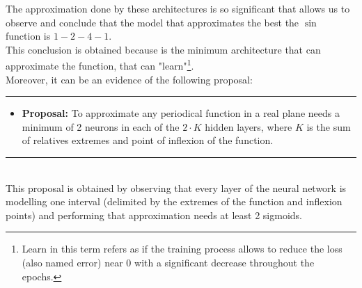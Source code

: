 \documentclass[a4paper, 11pt]{article}
\begin{document}
The approximation done by these architectures is so significant that allows us to observe and conclude that the model that approximates the best the $\sin$ function is $1-2-4-1$.\\
This conclusion is obtained because is the minimum architecture that can approximate the function, that can "learn"\footnote{Learn in this term refers as if the training process allows to reduce the loss (also named error) near 0 with a significant decrease throughout the epochs.}.\\
Moreover, it can be an evidence of the following proposal:\\
\rule{\linewidth}{0.4pt}
\begin{itemize}
    \item \textbf{Proposal:} To approximate any periodical function in a real plane needs a minimum of 2 neurons in each of the $2\cdot K$ hidden layers, where $K$ is the sum of relatives extremes and point of inflexion of the function.
\end{itemize}
\rule{\linewidth}{0.4pt}\\ \vspace{0.5em}
This proposal is obtained by observing that every layer of the neural network is modelling one interval (delimited by the extremes of the function and inflexion points) and performing that approximation needs at least 2 sigmoids.
\end{document}
